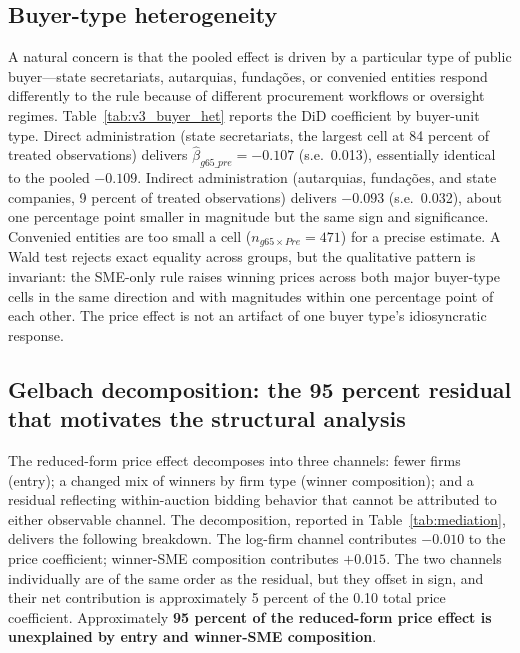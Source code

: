 \subsection{Buyer-type heterogeneity}

A natural concern is that the pooled effect is driven by a particular type of public buyer---state secretariats, autarquias, fundações, or convenied entities respond differently to the rule because of different procurement workflows or oversight regimes. Table~\ref{tab:v3_buyer_het} reports the DiD coefficient by buyer-unit type. Direct administration (state secretariats, the largest cell at 84 percent of treated observations) delivers $\hat\beta_{g65\_pre} = -0.107$ (s.e.\ 0.013), essentially identical to the pooled $-0.109$. Indirect administration (autarquias, fundações, and state companies, 9 percent of treated observations) delivers $-0.093$ (s.e.\ 0.032), about one percentage point smaller in magnitude but the same sign and significance. Convenied entities are too small a cell ($n_{g65 \times Pre} = 471$) for a precise estimate. A Wald test rejects exact equality across groups, but the qualitative pattern is invariant: the SME-only rule raises winning prices across both major buyer-type cells in the same direction and with magnitudes within one percentage point of each other. The price effect is not an artifact of one buyer type's idiosyncratic response.

\subsection{Gelbach decomposition: the 95 percent residual that motivates the structural analysis}

The reduced-form price effect decomposes into three channels: fewer firms (entry); a changed mix of winners by firm type (winner composition); and a residual reflecting within-auction bidding behavior that cannot be attributed to either observable channel. The \citet{gelbach2016} decomposition, reported in Table~\ref{tab:mediation}, delivers the following breakdown. The log-firm channel contributes $-0.010$ to the price coefficient; winner-SME composition contributes $+0.015$. The two channels individually are of the same order as the residual, but they offset in sign, and their net contribution is approximately 5 percent of the 0.10 total price coefficient. Approximately \textbf{95 percent of the reduced-form price effect is unexplained by entry and winner-SME composition}.



